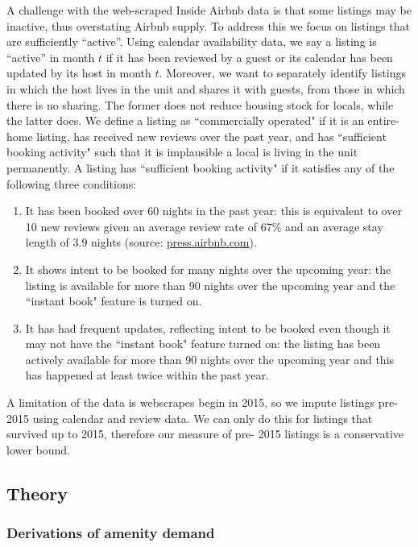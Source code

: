 \documentclass[11pt]{article}
\begin{document}
A challenge with the web-scraped Inside Airbnb data is that some listings may be inactive, thus overstating Airbnb supply. To address this we focus on listings that are sufficiently ``active''. Using calendar availability data, we say a listing is ``active'' in month $t$ if it has been reviewed by a guest or its calendar has been updated by its host in month $t$. Moreover, we want to separately identify listings in which the host lives in the unit and shares it with guests, from those in which there is no sharing. The former does not reduce housing stock for locals, while the latter does. We define a listing as ``commercially operated" if it is an entire-home listing, has received new reviews over the past year, and has ``sufficient booking activity" such that it is implausible a local is living in the unit permanently. A listing has ``sufficient booking activity" if it satisfies any of the following three conditions:
\begin{enumerate}
	    \item It has been booked over 60 nights in the past year: this is equivalent to over 10 new reviews given an average review rate of 67\% \citep{fradkin2018determinants} and an average stay length of 3.9 nights (source: \href{https://press.airbnb.com/instant-book-updates/}{press.airbnb.com}).
		\item It shows intent to be booked for many nights over the upcoming year: the listing is available for more than 90 nights over the upcoming year and the ``instant book" feature is turned on.
		\item It has had frequent updates, reflecting intent to be booked even though it may not have the ``instant book" feature turned on: the listing has been actively available for more than 90 nights over the upcoming year and this has happened at least twice within the past year.
\end{enumerate}
A limitation of the data is webscrapes begin in 2015, so we impute listings pre-2015 using calendar and review data. We can only do this for listings that survived up to 2015, therefore our measure of pre- 2015 listings is a conservative lower bound. 




\subsection{Theory}

\subsubsection{Derivations of amenity demand}\label{sec: appendix microfoundation-amenity demand}
\end{document}
